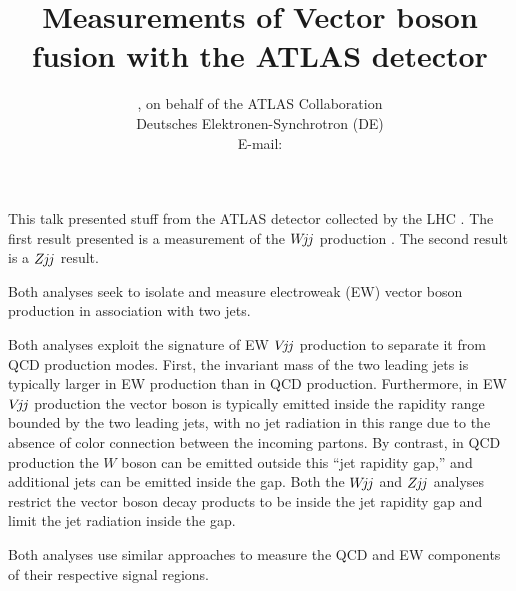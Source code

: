 \documentclass{PoS}
\title{Measurements of Vector boson fusion with the ATLAS detector}
\author{\speaker{Kurt Brendlinger},
        on behalf of the ATLAS Collaboration\\
       Deutsches Elektronen-Synchrotron (DE)\\
       E-mail: \email{kurt.brendlinger@cern.ch}}
\def\wjj{\ensuremath{W\kern -0.2em j\kern -0.1emj}\xspace}
\def\zjj{\ensuremath{Z\kern -0.1em j\kern -0.1emj}\xspace}
\def\vjj{\ensuremath{V\kern -0.2em j\kern -0.1emj}\xspace}
\def\w{\ensuremath{W}\xspace}
\def\mjj{\ensuremath{M_{jj}}\xspace}
\begin{document}
This talk presented stuff from the ATLAS detector \cite{Aad:2008zzm} collected by the
LHC \cite{Evans:2008zzb}.
The first result presented is a measurement of the \wjj production \cite{Aaboud:2017fye}.
The second result is a \zjj result.

Both analyses seek to isolate and measure electroweak (EW) vector boson production in association with
two jets.

Both analyses exploit the signature of EW \vjj production to separate it from QCD production modes.
First, the invariant mass of the two leading jets is typically larger in EW production than
in QCD production.
Furthermore, in EW \vjj production the vector boson is typically emitted inside the
rapidity range bounded by the two leading jets, with no jet radiation in this range due to the absence
of color connection between the incoming partons.
By contrast, in QCD production the \w boson can be emitted outside this ``jet rapidity gap,'' and
additional jets can be emitted inside the gap.
Both the \wjj and \zjj analyses restrict the vector boson decay products to be inside the jet rapidity
gap and limit the jet radiation inside the gap.


Both analyses use similar approaches to measure the QCD and EW components of their respective signal
regions.
\end{document}

